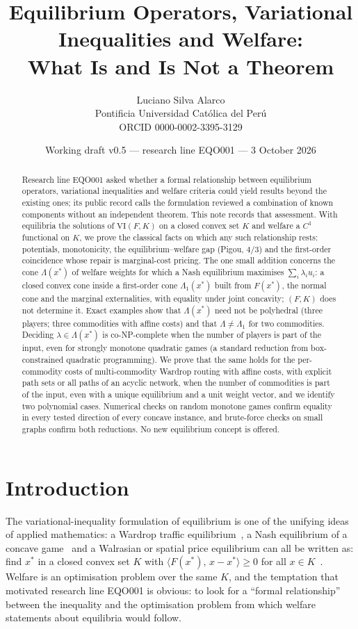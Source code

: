 \documentclass[11pt,a4paper]{article}
\title{\textbf{Equilibrium Operators, Variational Inequalities and Welfare:}\\[2pt]
\large What Is and Is Not a Theorem}
\author{Luciano Silva Alarco\\
\small Pontificia Universidad Cat\'olica del Per\'u\\
\small ORCID 0000-0002-3395-3129}
\date{\small Working draft v0.5 --- research line EQO001 --- 3 October 2026}
\theoremstyle{plain}
\theoremstyle{definition}
\theoremstyle{remark}
\newcommand{\VI}{\mathrm{VI}}
\newcommand{\ip}[2]{\langle #1,\,#2\rangle}
\newcommand{\Lam}{\Lambda}
\newcommand{\Lone}{\Lambda_{1}}
\begin{document}
\maketitle

\begin{abstract}
\noindent
Research line EQO001 asked whether a formal relationship between equilibrium operators, variational inequalities and welfare criteria could yield results beyond the existing ones; its public record calls the formulation reviewed a combination of known components without an independent theorem. This note records that assessment. With equilibria the solutions of $\VI(F,K)$ on a closed convex set $K$ and welfare a $C^1$ functional on $K$, we prove the classical facts on which any such relationship rests: potentials, monotonicity, the equilibrium--welfare gap (Pigou, $4/3$) and the first-order coincidence whose repair is marginal-cost pricing. The one small addition concerns the cone $\Lam(x^*)$ of welfare weights for which a Nash equilibrium maximises $\sum_i\lambda_iu_i$: a closed convex cone inside a first-order cone $\Lone(x^*)$ built from $F(x^*)$, the normal cone and the marginal externalities, with equality under joint concavity; $(F,K)$ does not determine it. Exact examples show that $\Lam(x^*)$ need not be polyhedral (three players; three commodities with affine costs) and that $\Lam\ne\Lone$ for two commodities. Deciding $\lambda\in\Lam(x^*)$ is co-NP-complete when the number of players is part of the input, even for strongly monotone quadratic games (a standard reduction from box-constrained quadratic programming). We prove that the same holds for the per-commodity costs of multi-commodity Wardrop routing with affine costs, with explicit path sets or all paths of an acyclic network, when the number of commodities is part of the input, even with a unique equilibrium and a unit weight vector, and we identify two polynomial cases. Numerical checks on \RndTotalInst{} random monotone games confirm equality in every tested direction of every concave instance, and brute-force checks on small graphs confirm both reductions. No new equilibrium concept is offered.
\end{abstract}

\section{Introduction}\label{sec:intro}

The variational-inequality formulation of equilibrium is one of the unifying ideas of applied mathematics: a Wardrop traffic equilibrium~\citep{wardrop1952}, a Nash equilibrium of a concave game~\citep{nash1951,rosen1965} and a Walrasian or spatial price equilibrium can all be written as: find $x^*$ in a closed convex set $K$ with $\ip{F(x^*)}{x-x^*}\ge 0$ for all $x\in K$~\citep{hartmanStampacchia1966,kinderlehrer1980,dafermos1980,harkerPang1990,nagurney1993,facchineiPang2003}. Welfare is an optimisation problem over the same $K$, and the temptation that motivated research line EQO001 is obvious: to look for a ``formal relationship'' between the inequality and the optimisation problem from which welfare statements about equilibria would follow.
\end{document}
